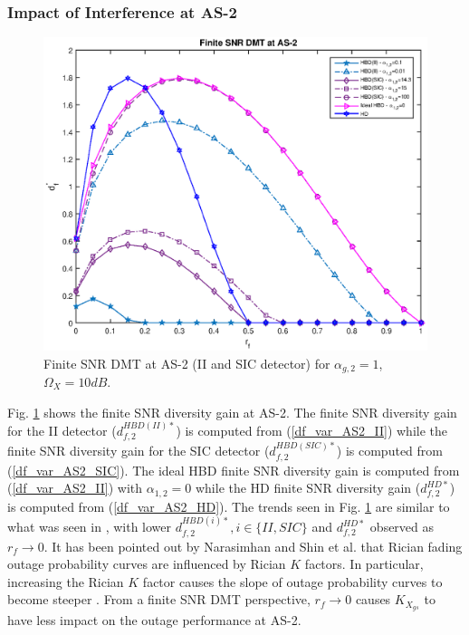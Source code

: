 \subsubsection{Impact of Interference at AS-2}

\begin{figure} []
\centering
\includegraphics [width=0.6\columnwidth]{chap4_fig/var_df_as2.eps} 
\vspace{-0.5cm}
\caption{Finite SNR DMT at AS-2 (II and SIC detector) for $\alpha_{g,2}=1$, $\Omega_X=10dB$.}
\vspace{-0.5cm}
\label{fig:var_df_as2}
\end{figure}

Fig. \ref{fig:var_df_as2} shows the finite SNR diversity gain at AS-2. The finite SNR diversity gain for the II detector ($d_{f,2}^{HBD(II)*}$) is computed from (\ref{df_var_AS2_II}) while the finite SNR diversity gain for the SIC detector ($d_{f,2}^{HBD(SIC)*}$) is computed from (\ref{df_var_AS2_SIC}). The ideal HBD finite SNR diversity gain is computed from (\ref{df_var_AS2_II}) with $\alpha_{1,2}=0$ while the HD finite SNR diversity gain ($d_{f,2}^{HD*}$) is computed from (\ref{df_var_AS2_HD}). The trends seen in Fig. \ref{fig:var_df_as2} are similar to what was seen in \cite[Fig. 4]{narasimhan2006finite}, with lower $d_{f,2}^{HBD(i)*}, i \in \{II,SIC\}$ and $d_{f,2}^{HD*}$ observed as $r_f \to 0$. It has been pointed out by Narasimhan \cite{narasimhan2006finite} and Shin et al. \cite{shin2008diversity} that Rician fading outage probability curves are influenced by Rician $K$ factors. In particular, increasing the Rician $K$ factor causes the slope of outage probability curves to become steeper \cite[Fig. 2]{shin2008diversity}. From a finite SNR DMT perspective, $r_f \to 0$ causes $K_{X_{gs}}$ to have less impact on the outage performance at AS-2. 

